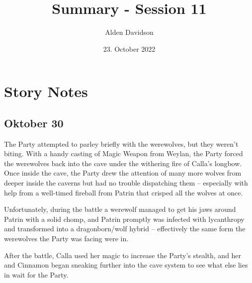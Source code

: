 \documentclass[a4paper,11pt]{article}
\title{Summary - Session 11}
\author{Alden Davidson}
\date{23. October 2022}
\begin{document}
\maketitle

\section{Story Notes}
\subsection{Oktober 30}
The Party attempted to parley briefly with the werewolves, but they weren't biting. With a handy casting of Magic 
Weapon from Weylan, the Party forced the werewolves back into the cave under the withering fire of Calla's longbow.
Once inside the cave, the Party drew the attention of many more wolves from deeper inside the caverns but had no
trouble dispatching them -- especially with help from a well-timed fireball from Patrin that crisped all the wolves 
at once.

Unfortunately, during the battle a werewolf managed to get his jaws around Patrin with a solid chomp, and Patrin
promptly was infected with lycanthropy and transformed into a dragonborn/wolf hybrid -- effectively the same form 
the werewolves the Party was facing were in.

After the battle, Calla used her magic to increase the Party's stealth, and her and Cinnamon began sneaking further 
into the cave system to see what else lies in wait for the Party.
\end{document}

